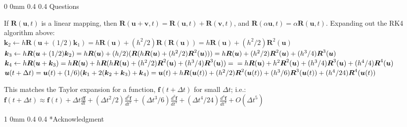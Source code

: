 \documentclass[11pt]{article}
\makeatletter
\renewcommand{\section}{\@startsection
{section}%
{0}%
{0mm}%
{0.4\baselineskip}%
{0.4\baselineskip}%
{\normalfont\Large\bfseries\color{myBrown}}}%
\renewcommand{\subsection}{\@startsection
{subsection}%
{1}%
{0mm}%
{0.4\baselineskip}%
{0.4\baselineskip}%
{\normalfont\large\bfseries\color{myBrown}}}%
\newcommand{\bvec}[1]{\ensuremath{\boldsymbol{#1}}}
\makeatother
\begin{document}
\newpage

\section{Questions}

If $\bvec{R}(\bvec{u},t)$ is a linear mapping, then $\bvec{R}(\bvec{u}+\bvec{v},t) = \bvec{R}(\bvec{u},t) + \bvec{R}(\bvec{v},t)$, and $\bvec{R}(\alpha\bvec{u},t) = \alpha\bvec{R}(\bvec{u},t)$. Expanding out the RK4 algorithm above:\\

$\bvec{k}_2 \leftarrow h\bvec{R}(\bvec{u}+(1/2)\bvec{k}_1) = h\bvec{R}(\bvec{u}) + (h^2/2)\bvec{R}(\bvec{R}(\bvec{u})) = h\bvec{R}(\bvec{u}) + (h^2/2)\bvec{R}^2(\bvec{u})$ \\

$\bvec{k}_3 \leftarrow h\bvec{R}(\bvec{u}+(1/2)\bvec{k}_2) = 
h\bvec{R}(\bvec{u}) + (h/2)(\bvec{R}(h\bvec{R}(\bvec{u}) + (h^2/2)\bvec{R}^2(\bvec{u}))) \\ \hspace{\fill}
= h\bvec{R}(\bvec{u}) + (h^2/2)\bvec{R}^2(\bvec{u}) + (h^3/4)\bvec{R}^3(\bvec{u})$ \\

$\bvec{k}_4 \leftarrow h\bvec{R}(\bvec{u} + \bvec{k}_3) = h\bvec{R}(\bvec{u}) + h\bvec{R}(h\bvec{R}(\bvec{u}) + (h^2/2)\bvec{R}^2(\bvec{u}) + (h^3/4)\bvec{R}^3(\bvec{u})) = \\
= h\bvec{R}(\bvec{u}) + h^2\bvec{R}^2(\bvec{u}) + (h^3/4)\bvec{R}^3(\bvec{u}) + (h^4/4)\bvec{R}^4(\bvec{u})$ \\

$\bvec{u}(t+\Delta{t}) = \bvec{u}(t) + (1/6)(\bvec{k}_1 + 2(\bvec{k}_2 + \bvec{k}_3) + \bvec{k}_4) = \\
\bvec{u}(t) + h\bvec{R}(\bvec{u}(t)) + (h^2/2)\bvec{R}^2(\bvec{u}(t)) + (h^3/6)\bvec{R}^3(\bvec{u}(t)) + (h^4/24)\bvec{R}^4(\bvec{u}(t))$

This matches the Taylor expansion for a function, $\bvec{f}(t+\Delta{t})$ for small $\Delta{t}$; i.e.:\\


$\bvec{f}(t+\Delta{t}) \approx \bvec{f}(t) + \Delta{t}\frac{d\bvec{f}}{dt} + ({\Delta{t}}^2/2)\frac{d^2\bvec{f}}{dt^2} + ({\Delta{t}}^3/6)\frac{d^3\bvec{f}}{dt^3} + ({\Delta{t}}^4/24)\frac{d^4\bvec{f}}{dt^4} + O({\Delta{t}}^5)$


\newpage



\newpage

\subsection*{Acknowledgment}
\end{document}
